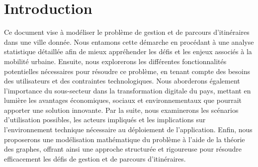 \section{Introduction}
Ce document vise à modéliser le problème de gestion et de parcours d'itinéraires dans une ville donnée. Nous entamons cette démarche en procédant à une analyse statistique détaillée afin de mieux appréhender les défis et les enjeux associés à la mobilité urbaine. Ensuite, nous explorerons les différentes fonctionnalités potentielles nécessaires pour résoudre ce problème, en tenant compte des besoins des utilisateurs et des contraintes technologiques. Nous aborderons également l'importance du sous-secteur dans la transformation digitale du pays, mettant en lumière les avantages économiques, sociaux et environnementaux que pourrait apporter une solution innovante. Par la suite, nous examinerons les scénarios d'utilisation possibles, les acteurs impliqués et les implications sur l'environnement technique nécessaire au déploiement de l'application. Enfin, nous proposerons une modélisation mathématique du problème à l'aide de la théorie des graphes, offrant ainsi une approche structurée et rigoureuse pour résoudre efficacement les défis de gestion et de parcours d'itinéraires.

